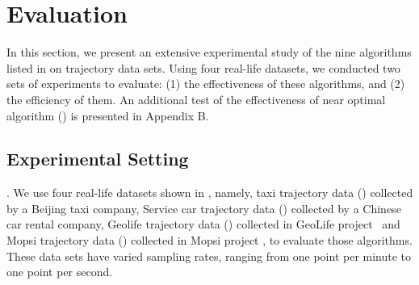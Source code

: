 \vspace{-1ex}
\section{Evaluation} %
\label{sec-exp}
In this section, we present an extensive experimental study of the nine \lsa algorithms listed in  on trajectory data sets.
Using four real-life datasets, we conducted two sets of experiments to evaluate:
(1) the effectiveness of these algorithms, and
(2) the efficiency of them.
{An additional test of the effectiveness of near optimal algorithm (\nopts) is presented in Appendix B.}

\vspace{-1ex}
\subsection{Experimental Setting}

.
We use four real-life datasets shown in , namely, taxi trajectory data (\taxi) collected by a Beijing taxi company, Service car trajectory data (\ucar) collected by a Chinese car rental company, Geolife trajectory data (\geolife) collected in GeoLife project~\cite{Web:Geolife} and Mopsi trajectory data (\mopsi) collected in Mopsi project \cite{Web:Mopsi}, to evaluate those \lsa algorithms. These data sets have varied sampling rates, ranging from one point per minute to one point per second.

